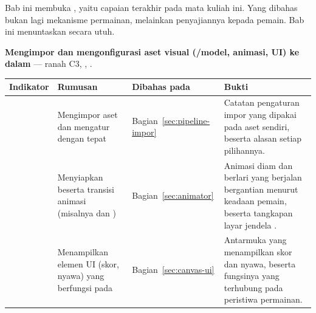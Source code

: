 \begin{subcpmkbox}
Bab ini membuka , yaitu capaian terakhir pada mata kuliah ini. Yang
dibahas bukan lagi mekanisme permainan, melainkan penyajiannya kepada pemain.
Bab ini menuntaskan  secara utuh.

\vspace{0.5em}
\textbf{ Mengimpor dan mengonfigurasi aset visual
(/model, animasi, UI) ke dalam } --- ranah C3,
, .

\vspace{0.5em}
{\setlength{\tabcolsep}{4pt}\footnotesize%
\begin{tabularx}{\textwidth}{@{}C{1.9cm} L{4.0cm} L{2.5cm} Y@{}}
\toprule
\headrow \textbf{Indikator} & \textbf{Rumusan} & \textbf{Dibahas pada} & \textbf{Bukti} \\
\midrule
{} & Mengimpor aset dan mengatur  dengan tepat &
Bagian~\ref{sec:pipeline-impor} &
Catatan pengaturan impor yang dipakai pada aset sendiri, beserta alasan setiap
pilihannya. \\
\addlinespace
{} & Menyiapkan  beserta transisi animasi (misalnya
 dan ) &
Bagian~\ref{sec:animator} &
Animasi diam dan berlari yang berjalan bergantian menurut keadaan pemain,
beserta tangkapan layar jendela . \\
\addlinespace
{} & Menampilkan elemen UI (skor, nyawa) yang berfungsi pada
 &
Bagian~\ref{sec:canvas-ui} &
Antarmuka yang menampilkan skor dan nyawa, beserta fungsinya yang terhubung
pada peristiwa permainan. \\
\bottomrule
\end{tabularx}}
\end{subcpmkbox}
